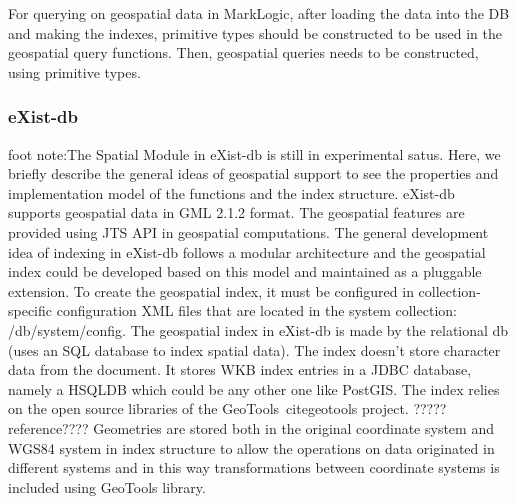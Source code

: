 \documentclass[a4paper,12pt]{article}
\begin{document}
For querying on geospatial data in MarkLogic, after loading the data into the DB and making the indexes, primitive types should be constructed to be used in the geospatial query functions. Then, geospatial queries needs to be constructed, using primitive types. 

\subsubsection{eXist-db}
foot note:The Spatial Module in eXist-db is still in experimental satus. Here, we briefly describe the general ideas of geospatial support to see the properties and implementation model of the functions and the index structure. 
eXist-db supports geospatial data in GML 2.1.2 format. The geospatial features are provided using JTS API in geospatial computations. 
The general development idea of indexing in eXist-db follows a modular architecture and the geospatial index could be developed based on this model and maintained as a pluggable extension. To create the geospatial index, it must be configured in collection-specific configuration XML files that are located in the system collection: /db/system/config. 
The geospatial index in eXist-db is made by the relational db (uses an SQL database to index spatial data). The index doesn't store character data from the document. It stores WKB index entries in a JDBC database, namely a HSQLDB which could be any other one like PostGIS. The index relies on the open source libraries of the GeoTools~cite{geotools} project. ?????reference???? Geometries are stored both in the original coordinate system and WGS84 system in index structure to allow the operations on data originated in different systems and in this way transformations between coordinate systems is included using GeoTools library.
 
\end{document}

